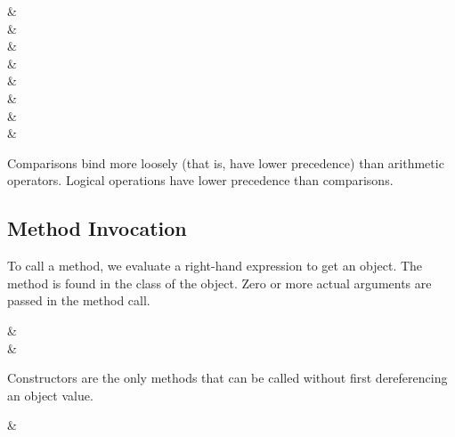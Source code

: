 \documentclass[11pt]{article}
\begin{document}
\begin{grammar}
 & 
     \literal{==} \\ 
 & 
     \literal{<=} \\ 
 & 
     \literal{<} \\ 
 & 
     \literal{>=} \\ 
 & 
     \literal{>} \\ 
 & 
      \\ 
 & 
      \\ 
 & 
     \\ 
\end{grammar}

Comparisons bind more loosely (that is, have lower precedence) than 
arithmetic operators.  Logical operations have lower precedence than
comparisons. 

\subsection{Method Invocation}

To call a method, we evaluate a right-hand expression to get an
object.  The method is found in the class of the object.  Zero or more
actual arguments are passed in the method call. 

\begin{grammar}
 &  
  \literal{(}  \literal{)}\\
 & 
\end{grammar}

Constructors are the only methods that can be called without first
dereferencing an object value. 

\begin{grammar}
 &  
     \literal{(}  \literal{)}
\end{grammar}
\end{document}
